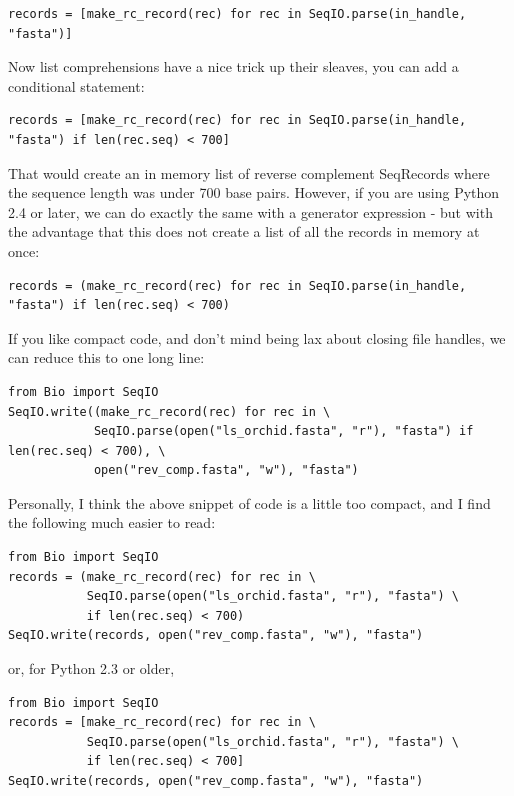 \documentclass{report}
\begin{document}
\begin{verbatim}
records = [make_rc_record(rec) for rec in SeqIO.parse(in_handle, "fasta")]
\end{verbatim}

\noindent Now list comprehensions have a nice trick up their sleaves, you can add a conditional statement:

\begin{verbatim}
records = [make_rc_record(rec) for rec in SeqIO.parse(in_handle, "fasta") if len(rec.seq) < 700]
\end{verbatim}

That would create an in memory list of reverse complement SeqRecords where the sequence length was under 700 base pairs. However, if you are using Python 2.4 or later, we can do exactly the same with a generator expression - but with the advantage that this does not create a list of all the records in memory at once:

\begin{verbatim}
records = (make_rc_record(rec) for rec in SeqIO.parse(in_handle, "fasta") if len(rec.seq) < 700)
\end{verbatim}

If you like compact code, and don't mind being lax about closing file handles, we can reduce this to one long line: 

\begin{verbatim}
from Bio import SeqIO
SeqIO.write((make_rc_record(rec) for rec in \
            SeqIO.parse(open("ls_orchid.fasta", "r"), "fasta") if len(rec.seq) < 700), \
            open("rev_comp.fasta", "w"), "fasta")
\end{verbatim}

Personally, I think the above snippet of code is a little too compact, and I find the following much easier to read:

\begin{verbatim}
from Bio import SeqIO
records = (make_rc_record(rec) for rec in \
           SeqIO.parse(open("ls_orchid.fasta", "r"), "fasta") \
           if len(rec.seq) < 700)
SeqIO.write(records, open("rev_comp.fasta", "w"), "fasta")
\end{verbatim}

\noindent or, for Python 2.3 or older,

\begin{verbatim}
from Bio import SeqIO
records = [make_rc_record(rec) for rec in \
           SeqIO.parse(open("ls_orchid.fasta", "r"), "fasta") \
           if len(rec.seq) < 700]
SeqIO.write(records, open("rev_comp.fasta", "w"), "fasta")
\end{verbatim}
\end{document}
